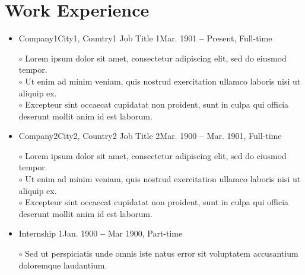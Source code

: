 \documentclass[a4paper,10pt]{article}
\begin{document}
\section*{Work Experience}
\MyHorizontalRule
  \vspace{-10pt}
  \begin{itemize}[leftmargin=0.15in, label={}, itemsep=-8pt]

    \item \resumeSubheading
      {Company1}{City1, Country1}
      {Job Title 1}{Mar. 1901 \textbf{--} Present, Full-time}
        \begin{itemize}
            \vspace{10pt}
            \hspace{-10pt}\textcolor{ColorOne}{$\circ$} Lorem ipsum dolor sit amet, consectetur adipiscing elit, sed do eiusmod tempor.\\
            \hspace{-10pt}\textcolor{ColorOne}{$\circ$} Ut enim ad minim veniam, quis nostrud exercitation ullamco laboris nisi ut aliquip ex.\\
            \hspace{-10pt}\textcolor{ColorOne}{$\circ$} Excepteur sint occaecat cupidatat non proident, sunt in culpa qui officia deserunt mollit anim id est laborum.
        \end{itemize}

    \item \resumeSubheading
      {Company2}{City2, Country2}
      {Job Title 2}{Mar. 1900 \textbf{--} Mar. 1901, Full-time}
        \begin{itemize}
            \vspace{10pt}
            \hspace{-10pt}\textcolor{ColorOne}{$\circ$} Lorem ipsum dolor sit amet, consectetur adipiscing elit, sed do eiusmod tempor.\\
            \hspace{-10pt}\textcolor{ColorOne}{$\circ$} Ut enim ad minim veniam, quis nostrud exercitation ullamco laboris nisi ut aliquip ex.\\
            \hspace{-10pt}\textcolor{ColorOne}{$\circ$} Excepteur sint occaecat cupidatat non proident, sunt in culpa qui officia deserunt mollit anim id est laborum.
        \end{itemize}

    \item \vspace{-25pt}
    \resumeSubheading
      {}{}
      {Internship 1}{Jan. 1900 \textbf{--} Mar 1900, Part-time}
        \begin{itemize}
            \vspace{10pt}
            \hspace{-10pt}\textcolor{ColorOne}{$\circ$} Sed ut perspiciatis unde omnis iste natus error sit voluptatem accusantium doloremque laudantium.
        \end{itemize}

  \end{itemize}
\end{document}
